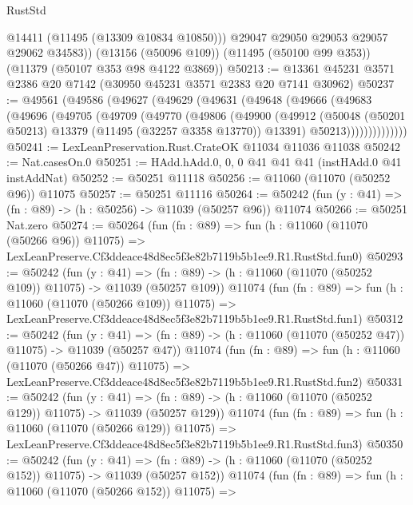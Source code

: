 \begin{lexlean}{RustStd}
\begin{coremodule}
          @14411
          (@11495 (@13309 @10834 @10850)))
        @29047
        @29050
        @29053
        @29057
        @29062
        @34583))
    (@13156 (@50096 @109))
    (@11495 (@50100 @99 @353))
    (@11379 (@50107 @353 @98 @4122 @3869))
@50213 := @13361 @45231 @3571 @2386 @20 @7142 (@30950 @45231 @3571 @2383 @20 @7141 @30962)
@50237 := @49561
    (@49586
      (@49627
        (@49629
          (@49631
            (@49648
              (@49666
                (@49683
                  (@49696
                    (@49705
                      (@49709
                        (@49770
                          (@49806
                            (@49900
                              (@49912
                                (@50048
                                  (@50201 @50213)
                                  @13379
                                  (@11495 (@32257 @3358 @13770))
                                  @13391)
                                @50213))))))))))))))
@50241 := LexLeanPreservation.Rust.CrateOK @11034 @11036 @11038
@50242 := Nat.casesOn.{0}
@50251 := HAdd.hAdd.{0, 0, 0} @41 @41 @41 (instHAdd.{0} @41 instAddNat)
@50252 := @50251 @11118
@50256 := @11060 (@11070 (@50252 @96)) @11075
@50257 := @50251 @11116
@50264 := @50242 (fun (y : @41) => (fn : @89) -> (h : @50256) -> @11039 (@50257 @96)) @11074
@50266 := @50251 Nat.zero
@50274 := @50264
    (fun (fn : @89) =>
    fun (h : @11060 (@11070 (@50266 @96)) @11075) =>
    LexLeanPreserve.Cf3ddeace48d8ec5f3e82b7119b5b1ee9.R1.RustStd.fun0)
@50293 := @50242
    (fun (y : @41) =>
    (fn : @89) -> (h : @11060 (@11070 (@50252 @109)) @11075) -> @11039 (@50257 @109))
    @11074
    (fun (fn : @89) =>
    fun (h : @11060 (@11070 (@50266 @109)) @11075) =>
    LexLeanPreserve.Cf3ddeace48d8ec5f3e82b7119b5b1ee9.R1.RustStd.fun1)
@50312 := @50242
    (fun (y : @41) =>
    (fn : @89) -> (h : @11060 (@11070 (@50252 @47)) @11075) -> @11039 (@50257 @47))
    @11074
    (fun (fn : @89) =>
    fun (h : @11060 (@11070 (@50266 @47)) @11075) =>
    LexLeanPreserve.Cf3ddeace48d8ec5f3e82b7119b5b1ee9.R1.RustStd.fun2)
@50331 := @50242
    (fun (y : @41) =>
    (fn : @89) -> (h : @11060 (@11070 (@50252 @129)) @11075) -> @11039 (@50257 @129))
    @11074
    (fun (fn : @89) =>
    fun (h : @11060 (@11070 (@50266 @129)) @11075) =>
    LexLeanPreserve.Cf3ddeace48d8ec5f3e82b7119b5b1ee9.R1.RustStd.fun3)
@50350 := @50242
    (fun (y : @41) =>
    (fn : @89) -> (h : @11060 (@11070 (@50252 @152)) @11075) -> @11039 (@50257 @152))
    @11074
    (fun (fn : @89) =>
    fun (h : @11060 (@11070 (@50266 @152)) @11075) =>

\end{coremodule}
\end{lexlean}
